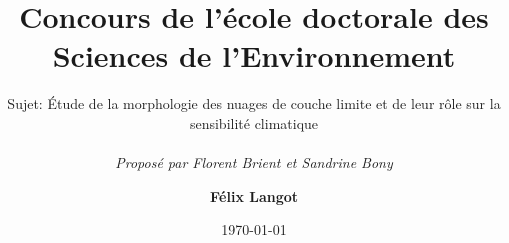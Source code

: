\documentclass[9pt]{beamer}
\begin{document}
\title{Concours de l'école doctorale des Sciences de l'Environnement}
\subtitle{Sujet: Étude de la morphologie des nuages de couche limite et de leur rôle sur la sensibilité climatique \\ ~\\
\textit{Proposé par Florent Brient et Sandrine Bony}}
\date{\today}
\author{\textbf{Félix Langot}}
{
\begin{frame}
  \maketitle
\end{frame}
}

\end{document}
